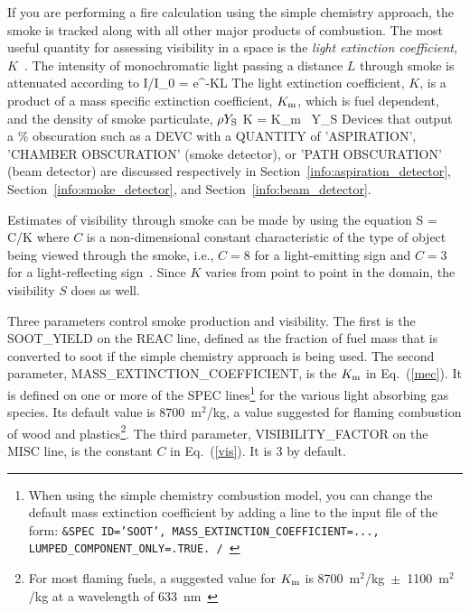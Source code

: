 \documentclass[11pt]{book}
\begin{document}
If you are performing a fire calculation using the simple chemistry approach, the smoke is tracked along with all other major products of combustion. The most useful quantity for assessing visibility in a space is the {\em light extinction coefficient}, $K$~\cite{SFPE:Mulholland}. The intensity of monochromatic light passing a distance $L$ through smoke is attenuated according to
\be I/I_0 = {\rm e}^{-KL} \ee
The light extinction coefficient, $K$, is a product of a mass specific extinction coefficient, $K_{\rm m}$, which is fuel dependent, and the density of smoke particulate, $\rho Y_{\rm S}$
\be K = K_{\rm m} \; \rho \, Y_{\rm S} \label{mec} \ee
Devices that output a \% obscuration such as a {\ct DEVC} with a {\ct QUANTITY} of {\ct 'ASPIRATION'}, {\ct 'CHAMBER OBSCURATION'} (smoke detector), or {\ct 'PATH OBSCURATION'} (beam detector) are discussed respectively in Section~\ref{info:aspiration_detector}, Section~\ref{info:smoke_detector}, and Section~\ref{info:beam_detector}.

Estimates of visibility through smoke can be made by using the equation
\be  S = C/K  \label{vis}  \ee
where $C$ is a non-dimensional constant characteristic of the type of object being viewed through the smoke, i.e., $C=8$ for a light-emitting sign and $C=3$ for a light-reflecting sign~\cite{SFPE:Mulholland}. Since $K$ varies from point to point in the domain, the visibility $S$ does as well.

Three parameters control smoke production and visibility. The first is the {\ct SOOT\_YIELD} on the {\ct REAC} line, defined as the fraction of fuel mass that is converted to soot if the simple chemistry approach is being used. The second parameter, {\ct MASS\_EXTINCTION\_COEFFICIENT}, is the $K_{\rm m}$ in Eq.~(\ref{mec}). It is defined on one or more of the {\ct SPEC} lines\footnote{When using the simple chemistry combustion model, you can change the default mass extinction coefficient by adding a line to the input file of the form: \tt{\footnotesize \&SPEC ID='SOOT', MASS\_EXTINCTION\_COEFFICIENT=..., LUMPED\_COMPONENT\_ONLY=.TRUE. /} } for the various light absorbing gas species. Its default value is 8700~m$^2$/kg, a value suggested for flaming combustion of wood and plastics\footnote{For most flaming fuels, a suggested value for $K_{\rm m}$ is 8700~m$^2$/kg~$\pm$~1100~m$^2$/kg at a wavelength of 633~nm~\cite{Mulholland:F+M}}. The third parameter, {\ct VISIBILITY\_FACTOR} on the {\ct MISC} line, is the constant $C$ in Eq.~(\ref{vis}). It is 3 by default.
\end{document}
